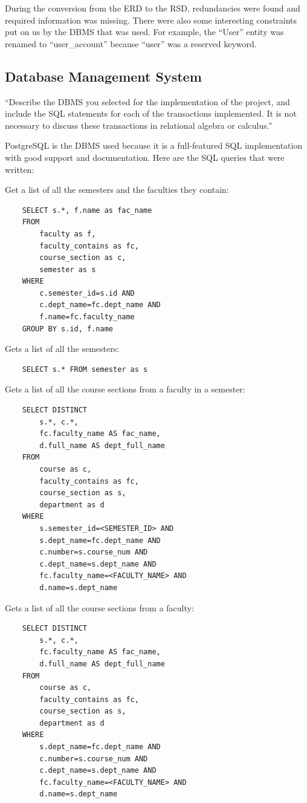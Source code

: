 \documentclass[twoside=false,a4paper,11pt]{article}
\theoremstyle{mytheor}
\begin{document}
During the conversion from the ERD to the RSD, redundancies were found and required information was missing. There were also some interesting constraints put on us by the DBMS that was used. For example, the ``User'' entity was renamed to ``user\_account'' because ``user'' was a reserved keyword.

\subsection*{Database Management System}

``Describe the DBMS you selected for the implementation	of the project, and include the SQL statements for each of the transactions implemented. It is not necessary to discuss these transactions in relational algebra or calculus.''

PostgreSQL is the DBMS used because it is a full-featured SQL implementation with good support and documentation. Here are the SQL queries that were written:

Get a list of all the semesters and the faculties they contain:
\begin{lstlisting}
    SELECT s.*, f.name as fac_name
    FROM
        faculty as f,
        faculty_contains as fc,
        course_section as c,
        semester as s
    WHERE
        c.semester_id=s.id AND
        c.dept_name=fc.dept_name AND
        f.name=fc.faculty_name
    GROUP BY s.id, f.name
\end{lstlisting}

Gets a list of all the semesters:
\begin{lstlisting}
    SELECT s.* FROM semester as s
\end{lstlisting}

Gets a list of all the course sections from a faculty in a semester:
\begin{lstlisting}
    SELECT DISTINCT
        s.*, c.*,
        fc.faculty_name AS fac_name,
        d.full_name AS dept_full_name
    FROM
        course as c,
        faculty_contains as fc,
        course_section as s,
        department as d
    WHERE
        s.semester_id=<SEMESTER_ID> AND
        s.dept_name=fc.dept_name AND
        c.number=s.course_num AND
        c.dept_name=s.dept_name AND
        fc.faculty_name=<FACULTY_NAME> AND
        d.name=s.dept_name
\end{lstlisting}

Gets a list of all the course sections from a faculty:
\begin{lstlisting}
    SELECT DISTINCT
        s.*, c.*,
        fc.faculty_name AS fac_name,
        d.full_name AS dept_full_name
    FROM
        course as c,
        faculty_contains as fc,
        course_section as s,
        department as d
    WHERE
        s.dept_name=fc.dept_name AND
        c.number=s.course_num AND
        c.dept_name=s.dept_name AND
        fc.faculty_name=<FACULTY_NAME> AND
        d.name=s.dept_name
\end{lstlisting}
\end{document}
